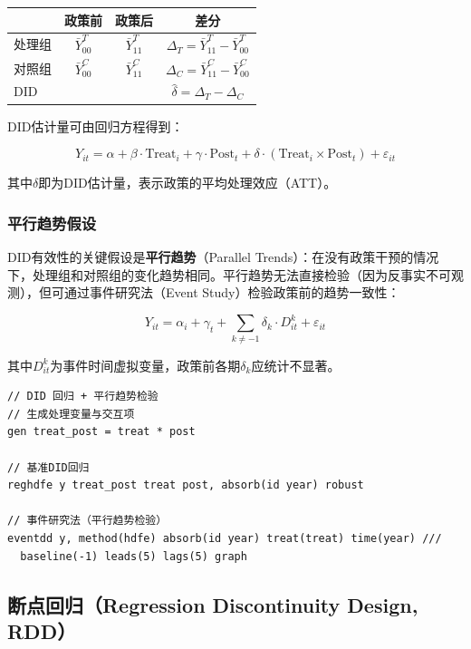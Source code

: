 \begin{table}[H]
\centering
\begin{tabular}{lccc}
\toprule
 & \textbf{政策前} & \textbf{政策后} & \textbf{差分} \\
\midrule
处理组 & $\bar{Y}_{00}^T$ & $\bar{Y}_{11}^T$ & $\Delta_T = \bar{Y}_{11}^T - \bar{Y}_{00}^T$ \\
对照组 & $\bar{Y}_{00}^C$ & $\bar{Y}_{11}^C$ & $\Delta_C = \bar{Y}_{11}^C - \bar{Y}_{00}^C$ \\
\midrule
DID & & & $\hat{\delta} = \Delta_T - \Delta_C$ \\
\bottomrule
\end{tabular}
\end{table}

DID估计量可由回归方程得到：

\[
Y_{it} = \alpha + \beta \cdot \text{Treat}_i + \gamma \cdot \text{Post}_t + \delta \cdot (\text{Treat}_i \times \text{Post}_t) + \varepsilon_{it}
\]

其中$\delta$即为DID估计量，表示政策的平均处理效应（ATT）。

\subsubsection{平行趋势假设}

DID有效性的关键假设是\textbf{平行趋势}（Parallel Trends）：在没有政策干预的情况下，处理组和对照组的变化趋势相同。平行趋势无法直接检验（因为反事实不可观测），但可通过事件研究法（Event Study）检验政策前的趋势一致性：

\[
Y_{it} = \alpha_i + \gamma_t + \sum_{k \neq -1} \delta_k \cdot D_{it}^k + \varepsilon_{it}
\]

其中$D_{it}^k$为事件时间虚拟变量，政策前各期$\delta_k$应统计不显著。

\begin{lstlisting}[style=stata]
// DID 回归 + 平行趋势检验
// 生成处理变量与交互项
gen treat_post = treat * post

// 基准DID回归
reghdfe y treat_post treat post, absorb(id year) robust

// 事件研究法（平行趋势检验）
eventdd y, method(hdfe) absorb(id year) treat(treat) time(year) ///
  baseline(-1) leads(5) lags(5) graph
\end{lstlisting}

\subsection{断点回归（Regression Discontinuity Design, RDD）}

